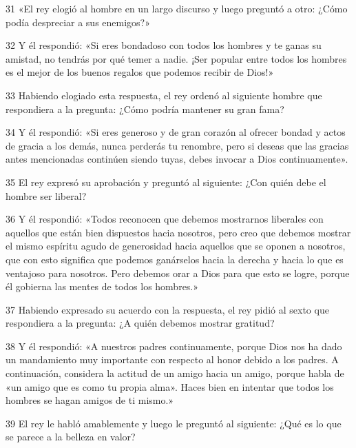 \par 31 «El rey elogió al hombre en un largo discurso y luego preguntó a otro: ¿Cómo podía despreciar a sus enemigos?»

\par 32 Y él respondió: «Si eres bondadoso con todos los hombres y te ganas su amistad, no tendrás por qué temer a nadie. ¡Ser popular entre todos los hombres es el mejor de los buenos regalos que podemos recibir de Dios!»

\par 33 Habiendo elogiado esta respuesta, el rey ordenó al siguiente hombre que respondiera a la pregunta: ¿Cómo podría mantener su gran fama?

\par 34 Y él respondió: «Si eres generoso y de gran corazón al ofrecer bondad y actos de gracia a los demás, nunca perderás tu renombre, pero si deseas que las gracias antes mencionadas continúen siendo tuyas, debes invocar a Dios continuamente».

\par 35 El rey expresó su aprobación y preguntó al siguiente: ¿Con quién debe el hombre ser liberal?

\par 36 Y él respondió: «Todos reconocen que debemos mostrarnos liberales con aquellos que están bien dispuestos hacia nosotros, pero creo que debemos mostrar el mismo espíritu agudo de generosidad hacia aquellos que se oponen a nosotros, que con esto significa que podemos ganárselos hacia la derecha y hacia lo que es ventajoso para nosotros. Pero debemos orar a Dios para que esto se logre, porque él gobierna las mentes de todos los hombres.»

\par 37 Habiendo expresado su acuerdo con la respuesta, el rey pidió al sexto que respondiera a la pregunta: ¿A quién debemos mostrar gratitud?

\par 38 Y él respondió: «A nuestros padres continuamente, porque Dios nos ha dado un mandamiento muy importante con respecto al honor debido a los padres. A continuación, considera la actitud de un amigo hacia un amigo, porque habla de «un amigo que es como tu propia alma». Haces bien en intentar que todos los hombres se hagan amigos de ti mismo.»

\par 39 El rey le habló amablemente y luego le preguntó al siguiente: ¿Qué es lo que se parece a la belleza en valor?

